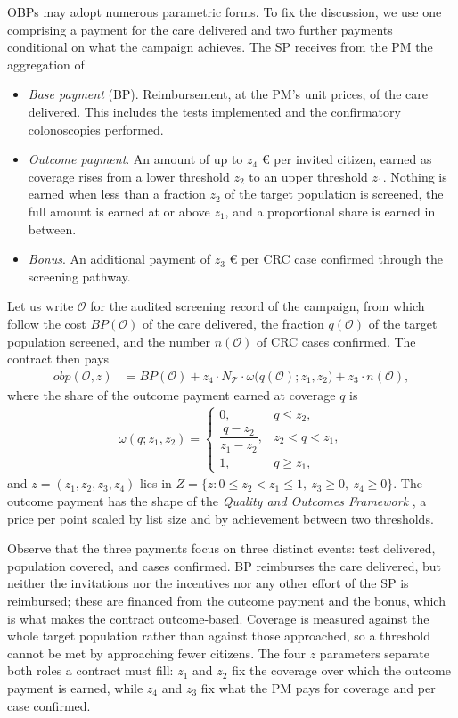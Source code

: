 \documentclass[12pt]{article}
\begin{document}
OBPs may adopt numerous parametric forms. To fix the discussion, we use one comprising a payment for the care delivered and two further payments conditional on what the campaign achieves. The SP receives from the PM the aggregation of
\begin{itemize}
    \item {\em Base payment} (BP). Reimbursement, at the PM's unit prices, of the care delivered. This includes the tests implemented and the confirmatory colonoscopies performed.
    \item {\em Outcome payment}. An amount of up to $z_4$ € per invited citizen, earned as coverage rises from a lower threshold $z_2$ to an upper threshold $z_1$. Nothing is earned when less than a fraction $z_2$ of the target population is screened, the full amount is earned at or above $z_1$, and a proportional share is earned in between.
    \item {\em Bonus}. An additional payment of $z_3$ € per CRC case confirmed through the screening pathway.
\end{itemize}
Let us write $\mathcal{O}$ for the audited screening record of the campaign, from which follow the cost $BP(\mathcal{O})$ of the care delivered, the fraction $q(\mathcal{O})$ of the target population screened, and the number $n(\mathcal{O})$ of CRC cases confirmed. The contract then pays
\begin{align}\label{eq:obp}
  obp(\mathcal{O}, z) &= BP(\mathcal{O}) + z_4 \cdot N_{\mathcal{T}} \cdot \omega\big(q(\mathcal{O}); z_1, z_2\big) + z_3 \cdot n(\mathcal{O}),
\end{align}
where the share of the outcome payment earned at coverage $q$ is
\begin{align}\label{eq:omega}
  \omega(q; z_1, z_2) =
  \begin{cases}
    0, & q \leq z_2, \\[2pt]
    \dfrac{q - z_2}{z_1 - z_2}, & z_2 < q < z_1, \\[8pt]
    1, & q \geq z_1,
  \end{cases}
\end{align}
and $z = (z_1, z_2, z_3, z_4)$ lies in $Z = \{ z : 0 \leq z_2 < z_1 \leq 1,\ z_3 \geq 0,\ z_4 \geq 0 \}$. The outcome payment has the shape of the \emph{Quality and Outcomes Framework} \citep{campbell2009effects}, a price per point scaled by list size and by achievement between two thresholds.


Observe that the three payments focus on three distinct events: test delivered, population covered, and cases confirmed. BP reimburses the care delivered, but neither the invitations nor the incentives nor any other effort of the SP is reimbursed; these are financed from the outcome payment and the bonus, which is what makes the contract outcome-based. Coverage is measured against the whole target population rather than against those approached, so a threshold cannot be met by approaching fewer citizens. The four $z$ parameters separate both roles a contract must fill: $z_1$ and $z_2$ fix the coverage over which the outcome payment is earned, while $z_4$ and $z_3$ fix what the PM pays for coverage and per case confirmed.
\end{document}
